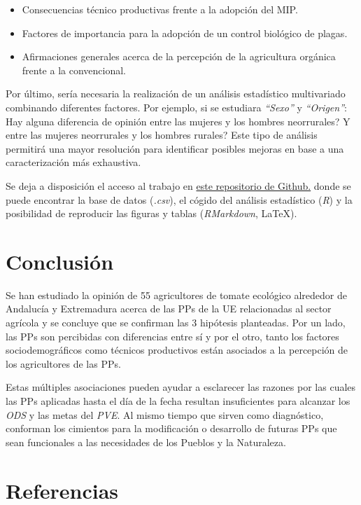 \documentclass[a4paper, nobind]{templates/ociamthesis}
\providecommand{\tightlist}{%
  \setlength{\itemsep}{0pt}\setlength{\parskip}{0pt}}
\begin{document}
\begin{itemize}
\tightlist
\item
  Consecuencias técnico productivas frente a la adopción del MIP.
\item
  Factores de importancia para la adopción de un control biológico de plagas.
\item
  Afirmaciones generales acerca de la percepción de la agricultura orgánica frente a la convencional.
\end{itemize}

Por último, sería necesaria la realización de un análisis estadístico multivariado combinando diferentes factores. Por ejemplo, si se estudiara \emph{``Sexo''} y \emph{``Origen''}: \textquestiondown Hay alguna diferencia de opinión entre las mujeres y los hombres neorrurales? \textquestiondown Y entre las mujeres neorrurales y los hombres rurales? Este tipo de análisis permitirá una mayor resolución para identificar posibles mejoras en base a una caracterización más exhaustiva.

Se deja a disposición el acceso al trabajo en \href{https://github.com/ipastore/TFM_UPO_UNIA_IPB.git}{este repositorio de Github.} donde se puede encontrar la base de datos (\emph{.csv}), el cógido del análisis estadístico (\emph{R}) y la posibilidad de reproducir las figuras y tablas (\emph{RMarkdown}, \LaTeX).

\hypertarget{conclusion}{%
\chapter{Conclusión}\label{conclusion}}

Se han estudiado la opinión de 55 agricultores de tomate ecológico alrededor de Andalucía y Extremadura acerca de las PPs de la UE relacionadas al sector agrícola y se concluye que se confirman las 3 hipótesis planteadas. Por un lado, las PPs son percibidas con diferencias entre sí y por el otro, tanto los factores sociodemográficos como técnicos productivos están asociados a la percepción de los agricultores de las PPs.

Estas múltiples asociaciones pueden ayudar a esclarecer las razones por las cuales las PPs aplicadas hasta el día de la fecha resultan insuficientes para alcanzar los \emph{ODS} y las metas del \emph{PVE}. Al mismo tiempo que sirven como diagnóstico, conforman los cimientos para la modificación o desarrollo de futuras PPs que sean funcionales a las necesidades de los Pueblos y la Naturaleza.

\hypertarget{referencias}{%
\chapter*{Referencias}\label{referencias}}
\end{document}
